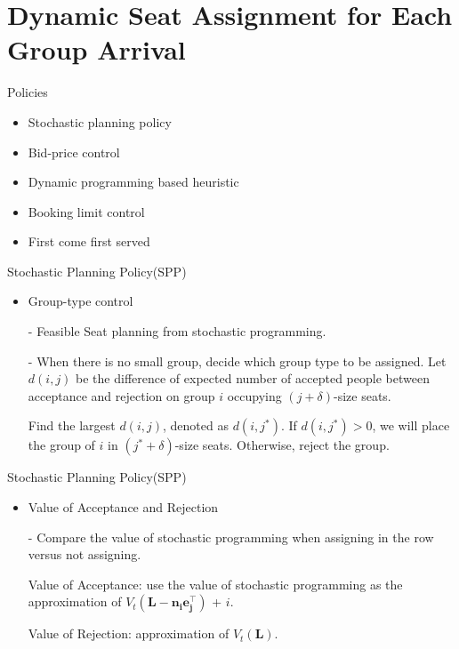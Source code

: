 
\section{Dynamic Seat Assignment for Each Group Arrival}
    \frame{\sectionpage}
    \begin{frame}{Policies}
      \begin{itemize}
        \item Stochastic planning policy
        \item Bid-price control
        \item Dynamic programming based heuristic
        \item Booking limit control
        \item First come first served
      \end{itemize}
    \end{frame}

    \begin{frame}{Stochastic Planning Policy(SPP)}
      \begin{itemize}
        \item Group-type control
        \item[-] Feasible Seat planning from stochastic programming.
        \item[-] When there is no small group, decide which group type to be assigned.
        Let $d(i, j)$ be the difference of expected number of accepted people between acceptance and rejection on group $i$ occupying $(j + \delta)$-size seats.

        Find the largest $d(i, j)$, denoted as $d(i, j^{*})$. If $d(i, j^{*}) > 0$, we will place
the group of $i$ in $(j^{*} + \delta)$-size seats. Otherwise, reject the group.
      \end{itemize}
    \end{frame}

    \begin{frame}{Stochastic Planning Policy(SPP)}
      \begin{itemize}
        \item Value of Acceptance and Rejection
        \item[-] Compare the value of stochastic programming when assigning in the row versus not assigning.
        \item[] 
        Value of Acceptance: use the value of stochastic programming as the approximation of $V_{t} (\mathbf{L-n_i \mathbf{e}_j^{\top}})$ + $i$.
        
        Value of Rejection: approximation of $V_{t} (\mathbf{L})$.
      \end{itemize}
    \end{frame}

